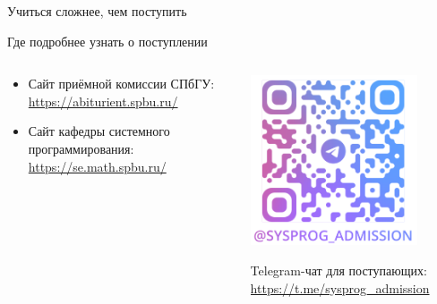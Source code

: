 \documentclass{slides-style}
\begin{document}
    \begin{frame}
        \begin{Huge}
            Учиться сложнее, чем поступить
        \end{Huge}

        \vspace{1cm}

    \end{frame}

    \begin{frame}{Где подробнее узнать о поступлении}
        \begin{columns}
            \begin{column}{0.5\textwidth}
                \begin{itemize}
                    \item Сайт приёмной комиссии СПбГУ: \url{https://abiturient.spbu.ru/}
                    \item Сайт кафедры системного программирования: \url{https://se.math.spbu.ru/}
                \end{itemize}
            \end{column}
            \begin{column}{0.5\textwidth}
                \begin{center}
                    \includegraphics[width=0.8\textwidth]{sysprogAdmission.png}
                    
                    Telegram-чат для поступающих:
                    \url{https://t.me/sysprog_admission}
                \end{center}
            \end{column}
        \end{columns}
    \end{frame}
\end{document}

